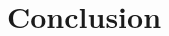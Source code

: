 \documentclass{article}
\begin{document}
\section{Conclusion}


\footnotesize{
\begin{spacing}{.85 }


\end{spacing}
}
\end{document}
